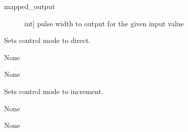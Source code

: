\documentclass[letterpaper,10pt,english]{sphinxmanual}
\begin{document}
\begin{fulllineitems}
\begin{fulllineitems}
\begin{description}
\end{description}

\sphinxAtStartPar
{}
\begin{description}
\item[{mapped\_output}] \leavevmode{[}int{]}
\sphinxAtStartPar
pulse width to output for the given input value

\end{description}

\end{fulllineitems}


\begin{fulllineitems}
\label{\detokenize{specific:NeckTiltOutput.NeckTiltOutput.set_control_direct}}
\sphinxAtStartPar
Sets control mode to direct.

\sphinxAtStartPar
{}

\sphinxAtStartPar
None

\sphinxAtStartPar
{}

\sphinxAtStartPar
None

\end{fulllineitems}


\begin{fulllineitems}
\label{\detokenize{specific:NeckTiltOutput.NeckTiltOutput.set_control_increment}}
\sphinxAtStartPar
Sets control mode to increment.

\sphinxAtStartPar
{}

\sphinxAtStartPar
None

\sphinxAtStartPar
{}

\sphinxAtStartPar
None

\end{fulllineitems}



\end{fulllineitems}
\end{document}

